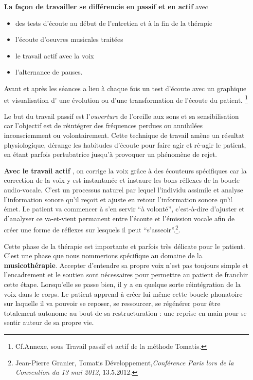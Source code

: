 \textbf{La façon de travailler se différencie en passif et en actif}
avec 
\begin{itemize}
\item des tests d'écoute au début de l'entretien et à la fin de la thérapie
\item l'écoute d'oeuvres musicales traitées
\item le travail actif avec la voix
\item l'alternance de pauses.
\end{itemize}

Avant et après les séances a lieu à chaque fois un test d'écoute avec un
graphique et visualisation d' une évolution
ou d'une transformation de l'écoute du patient.
 \footnote{Cf.Annexe, sous Travail
   passif et actif de la méthode Tomatis.}



 
Le but du travail passif est l'\emph{ouverture} de l'oreille
aux sons et sa sensibilisation car l'objectif est de réintégrer
des fréquences perdues ou annihilées inconsciemment ou volontairement. 
Cette technique de travail amène un résultat
physiologique, dérange les habitudes d'écoute pour faire agir
et ré-agir le patient, en étant parfois pertubatrice jusqu'à provoquer
un phénomène de rejet.


\textbf{Avec le travail actif }, on corrige la voix grâce à des écouteurs spécifiques 
car la correction de la voix y est instantanée et instaure les bons
réflexes de la boucle audio-vocale. C'est un processus naturel par
lequel l'individu assimile et analyse l'information sonore qu'il reçoit
et ajuste en retour l'information sonore qu'il émet. Le patient va
commencer à s'en servir ``à volonté'', c'est-à-dire d'ajuster et
d'analyser ce va-et-vient permanent entre l'écoute et l'émission vocale
afin de créer une forme de réflexes sur lesquels il peut ``s'asseoir''.\footnote{Jean-Pierre Granier, Tomatis 
Développement,\emph{Conférence Paris lors de la Convention du 13 mai 2012}, 13.5.2012.}.

Cette phase de la thérapie est importante et parfois très délicate
pour le patient. C'est une phase que nous nommerions spécifique au domaine de 
la \textbf{musicothérapie}.  Accepter d'entendre sa propre voix n'est pas toujours
simple et l'encadrement et le soutien sont nécessaires pour permettre
au patient de franchir cette étape. Lorsqu'elle se passe bien, il
y a en quelque sorte réintégration de la voix dans le corps. Le patient
apprend à créer lui-même cette boucle phonatoire sur laquelle il va
pouvoir se reposer, se ressourcer, se régénérer pour être totalement
autonome au bout de sa restructuration : une reprise en main pour se sentir auteur de sa propre vie. 


